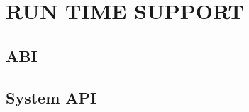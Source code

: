 \chapter{RUN TIME SUPPORT}
\label{rt}

\section{ABI}
\label{rt:abi}

\section{System API}
\label{rt:sys-api}
